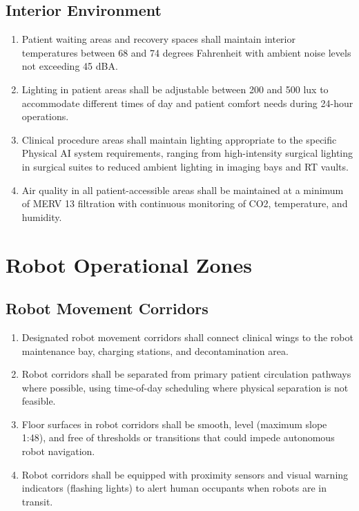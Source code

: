 \documentclass[11pt,letterpaper]{article}
\begin{document}
\subsection{Interior Environment}

\begin{enumerate}[label=(\alph*)]
\item Patient waiting areas and recovery spaces shall maintain interior
  temperatures between 68 and 74 degrees Fahrenheit with ambient noise levels
  not exceeding 45 dBA.

\item Lighting in patient areas shall be adjustable between 200 and 500 lux to
  accommodate different times of day and patient comfort needs during 24-hour
  operations.

\item Clinical procedure areas shall maintain lighting appropriate to the
  specific Physical AI system requirements, ranging from high-intensity surgical
  lighting in surgical suites to reduced ambient lighting in imaging bays and
  RT vaults.

\item Air quality in all patient-accessible areas shall be maintained at a
  minimum of MERV 13 filtration with continuous monitoring of CO2, temperature,
  and humidity.
\end{enumerate}

\section{Robot Operational Zones}

\subsection{Robot Movement Corridors}

\begin{enumerate}[label=(\alph*)]
\item Designated robot movement corridors shall connect clinical wings to the
  robot maintenance bay, charging stations, and decontamination area.

\item Robot corridors shall be separated from primary patient circulation
  pathways where possible, using time-of-day scheduling where physical
  separation is not feasible.

\item Floor surfaces in robot corridors shall be smooth, level (maximum slope
  1:48), and free of thresholds or transitions that could impede autonomous
  robot navigation.

\item Robot corridors shall be equipped with proximity sensors and visual
  warning indicators (flashing lights) to alert human occupants when robots
  are in transit.
\end{enumerate}
\end{document}
